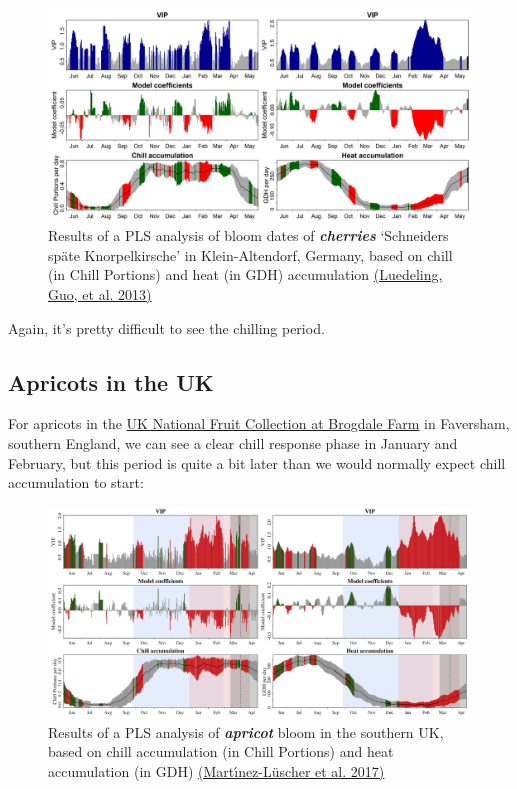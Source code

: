 \documentclass[
]{book}
\begin{document}
\begin{figure}
\centering
\includegraphics{pictures/PLS_chill_force_cherry_KA.png}
\caption{Results of a PLS analysis of bloom dates of \textbf{\emph{cherries}} `Schneiders späte Knorpelkirsche' in Klein-Altendorf, Germany, based on chill (in Chill Portions) and heat (in GDH) accumulation \href{https://www.sciencedirect.com/science/article/pii/S0168192313001780}{(Luedeling, Guo, et al. \protect\hyperlink{ref-luedeling2013differential}{2013})}}
\end{figure}

Again, it's pretty difficult to see the chilling period.

\hypertarget{apricots-in-the-uk}{%
\subsection{Apricots in the UK}\label{apricots-in-the-uk}}

For apricots in the \href{http://www.nationalfruitcollection.org.uk/}{UK National Fruit Collection at Brogdale Farm} in Faversham, southern England, we can see a clear chill response phase in January and February, but this period is quite a bit later than we would normally expect chill accumulation to start:

\begin{figure}
\centering
\includegraphics{pictures/PLS_chill_force_apricot_UK.png}
\caption{Results of a PLS analysis of \textbf{\emph{apricot}} bloom in the southern UK, based on chill accumulation (in Chill Portions) and heat accumulation (in GDH) \href{https://www.sciencedirect.com/science/article/abs/pii/S0168192317300503}{(Martı́nez-Lüscher et al. \protect\hyperlink{ref-martinez2017delayed}{2017})}}
\end{figure}
\end{document}
